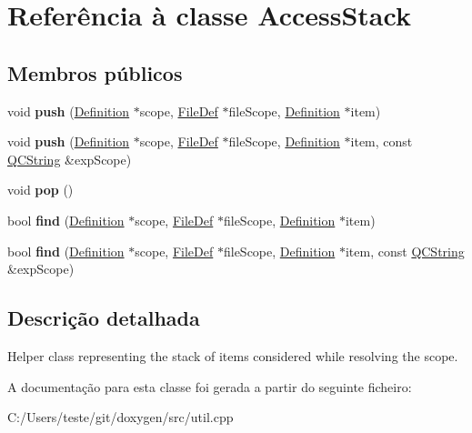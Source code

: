 \hypertarget{class_access_stack}{\section{Referência à classe Access\-Stack}
\label{class_access_stack}
}
\subsection*{Membros públicos}
\begin{DoxyCompactItemize}
\item 
\hypertarget{class_access_stack_a770760b8cb3a37199be7674943cca4e0}{void {\bfseries push} (\hyperlink{class_definition}{Definition} $\ast$scope, \hyperlink{class_file_def}{File\-Def} $\ast$file\-Scope, \hyperlink{class_definition}{Definition} $\ast$item)}\label{class_access_stack_a770760b8cb3a37199be7674943cca4e0}

\item 
\hypertarget{class_access_stack_ad56084a9ad18f00d8c7709377898a047}{void {\bfseries push} (\hyperlink{class_definition}{Definition} $\ast$scope, \hyperlink{class_file_def}{File\-Def} $\ast$file\-Scope, \hyperlink{class_definition}{Definition} $\ast$item, const \hyperlink{class_q_c_string}{Q\-C\-String} \&exp\-Scope)}\label{class_access_stack_ad56084a9ad18f00d8c7709377898a047}

\item 
\hypertarget{class_access_stack_a312e7f6c761a199c1369fbe651e084f0}{void {\bfseries pop} ()}\label{class_access_stack_a312e7f6c761a199c1369fbe651e084f0}

\item 
\hypertarget{class_access_stack_af12794e865f82afd906852a9f740ca99}{bool {\bfseries find} (\hyperlink{class_definition}{Definition} $\ast$scope, \hyperlink{class_file_def}{File\-Def} $\ast$file\-Scope, \hyperlink{class_definition}{Definition} $\ast$item)}\label{class_access_stack_af12794e865f82afd906852a9f740ca99}

\item 
\hypertarget{class_access_stack_ad0b1a28f743f50af30e0fdfc88cf6026}{bool {\bfseries find} (\hyperlink{class_definition}{Definition} $\ast$scope, \hyperlink{class_file_def}{File\-Def} $\ast$file\-Scope, \hyperlink{class_definition}{Definition} $\ast$item, const \hyperlink{class_q_c_string}{Q\-C\-String} \&exp\-Scope)}\label{class_access_stack_ad0b1a28f743f50af30e0fdfc88cf6026}

\end{DoxyCompactItemize}


\subsection{Descrição detalhada}
Helper class representing the stack of items considered while resolving the scope. 

A documentação para esta classe foi gerada a partir do seguinte ficheiro\-:\begin{DoxyCompactItemize}
\item 
C\-:/\-Users/teste/git/doxygen/src/util.\-cpp\end{DoxyCompactItemize}
